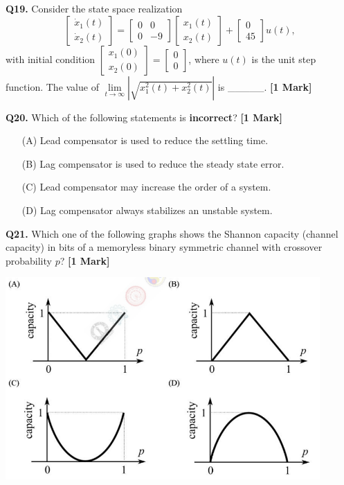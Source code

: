 \documentclass[11pt]{article}
\newcommand{\questiona}[2]{
    \noindent\textbf{Q#2.} #1 \hfill \textbf{[1 Mark]}
}
\begin{document}
\vspace{0.5cm}

\questiona{Consider the state space realization
\[
\begin{bmatrix}
\dot{x}_1(t) \\
\dot{x}_2(t)
\end{bmatrix} =
\begin{bmatrix}
0 & 0 \\
0 & -9
\end{bmatrix}
\begin{bmatrix}
x_1(t) \\
x_2(t)
\end{bmatrix}
+
\begin{bmatrix}
0 \\
45
\end{bmatrix}
u(t),
\]
with initial condition $\begin{bmatrix}x_1(0) \\ x_2(0)\end{bmatrix} = \begin{bmatrix}0 \\ 0\end{bmatrix}$,
where $u(t)$ is the unit step function. The value of $\lim\limits_{t\to\infty}\left|\sqrt{x_1^2(t)+x_2^2(t)}\right|$ is \_\_\_\_\_.}{19}

\vspace{0.5cm}

\questiona{Which of the following statements is \textbf{incorrect}?}{20}
\begin{enumerate}
    \item[(A)] Lead compensator is used to reduce the settling time.
    \item[(B)] Lag compensator is used to reduce the steady state error.
    \item[(C)] Lead compensator may increase the order of a system.
    \item[(D)] Lag compensator always stabilizes an unstable system.
\end{enumerate}

\vspace{0.5cm}

\questiona{Which one of the following graphs shows the Shannon capacity (channel capacity) in bits of a memoryless binary symmetric channel with crossover probability $p$?}{21}
\begin{center}
\includegraphics[width=0.9\textwidth]{figures/21.png}
\end{center}
\end{document}
